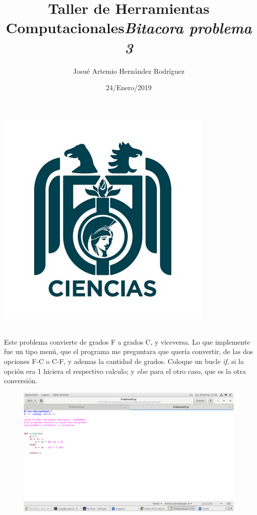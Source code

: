 \label{key}\documentclass[letterpaper, 12pt,oneside]{article}
\title{\Huge Taller de Herramientas Computacionales}
\author{Josué Artemio Hernández Rodríguez}
\date{24/Enero/2019}
\begin{document}
	\maketitle
	\begin{center}
		\includegraphics[scale=0.7]{3.jpg}
	\end{center}

	\newpage
	
	\title{\huge \textit{Bitacora problema 3 }}\\
	
	Este problema convierte de grados F a grados C, y viceversa. Lo que implemente fue un tipo menú, que el programa me preguntara que quería convertir, de las dos opciones F-C o C-F, y ademas la cantidad de grados. Coloque un bucle \textit{if}, si la opción era 1 hiciera el respectivo calculo; y \textit{else} para el otro caso, que es la otra conversión.

	\begin{figure}[h]
		\includegraphics[scale=0.3]{pro03.png}
	\end{figure}
	
	
	
	
	
	
	
	
	
	
	
\end{document}
